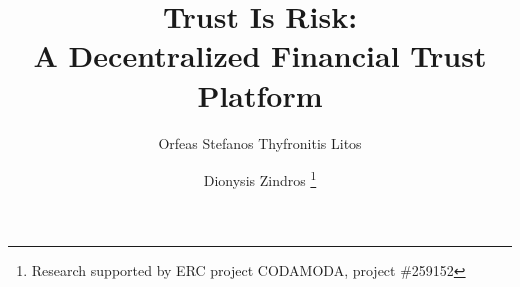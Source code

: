 \title{Trust Is Risk: \\ A Decentralized Financial Trust Platform}
\author{Orfeas Stefanos Thyfronitis Litos%
        \and Dionysis Zindros \fnmsep \thanks{Research supported by ERC project CODAMODA, project \#259152}}
\maketitle
